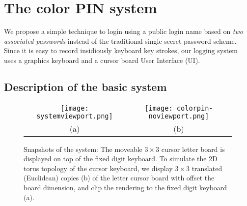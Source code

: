 \documentclass[12pt,onecolumn]{article}
\begin{document}
 

\section{The color PIN system\label{sec:colorPIN}}

We propose a simple technique to login using a public login name based on {\em two associated passwords} instead of the traditional single secret password scheme.
Since it is easy to record insidiously keyboard key strokes, our logging system uses a  graphics keyboard and a  cursor board  User Interface (UI).
 

\subsection{Description of the basic system}



\begin{figure}
\centering
 \begin{tabular}{cc}
 \texttt{[image: systemviewport.png]}  &
 \texttt{[image: colorpin-noviewport.png]}\\
 (a) & (b)
 \end{tabular}
  
\caption{
Snapshots of the system: The moveable  $3\times 3$ cursor letter board   is displayed on top of the fixed digit keyboard.  
To simulate the 2D torus topology of the cursor keyboard, we display $3\times 3$ translated (Euclidean) copies (b) of the letter cursor board with offset the board dimension, and clip the rendering to the fixed digit keyboard (a). 
\label{fig:torus}}
\end{figure} 
\end{document}
